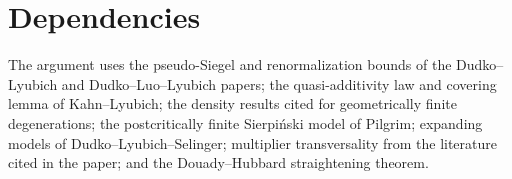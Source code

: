 \section{Dependencies}
\label{sec:digest-sierpinski-deps}

The argument uses the pseudo-Siegel and renormalization bounds of the Dudko--Lyubich and Dudko--Luo--Lyubich papers;
the quasi-additivity law and covering lemma of Kahn--Lyubich; the density results cited for geometrically finite
degenerations; the postcritically finite Sierpi\'nski model of Pilgrim; expanding models of Dudko--Lyubich--Selinger;
multiplier transversality from the literature cited in the paper; and the Douady--Hubbard straightening theorem.
